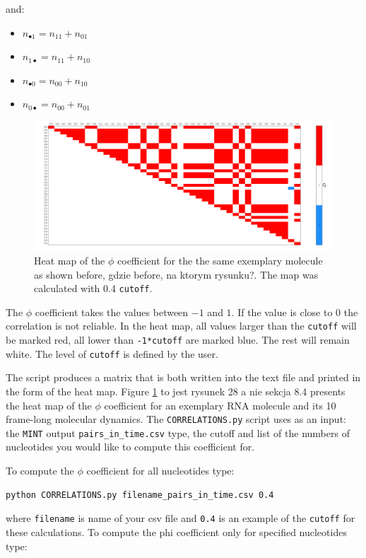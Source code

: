 \documentclass[12pt]{article}
\begin{document}
and:
\begin{itemize}
\item $n_{\bullet1} = n_{11}+n_{01}$
\item $n_{1\bullet} = n_{11}+n_{10}$
\item $n_{\bullet0} = n_{00}+n_{10}$
\item $n_{0\bullet} = n_{00}+n_{01}$
\end{itemize}

\begin{figure}[h!]
\label{coefficient}
\centering
\includegraphics[scale=0.4]{./pictures/correlation_matrix.png}
\caption{Heat map of the $\phi$ coefficient for the the same exemplary molecule as shown before, {\color{red} gdzie before, na ktorym rysunku?}. The map was calculated with 0.4 \texttt{cutoff}.}
\end{figure}

The $\phi$ coefficient takes the values between $-1$ and $1$. If the value is close to $0$ the correlation is not reliable. In the heat map, all values larger than the \texttt{cutoff} will be marked red, all lower than \texttt{-1*cutoff} are marked blue. The rest will remain white. The level of \texttt{cutoff} is defined by the user.

The script produces a matrix that is both written into the text file and printed in the form of the heat map. Figure \ref{coefficient} {\color{red}  to jest rysunek 28 a nie sekcja 8.4} presents the heat map of the $\phi$ coefficient for an exemplary RNA molecule and its 10 frame-long molecular dynamics. The \texttt{CORRELATIONS.py} script uses as an input: the \texttt{MINT} output \texttt{pairs\_in\_time.csv} type, the cutoff and list of the numbers of nucleotides you would like to compute this coefficient for.

To compute the $\phi$ coefficient for all nucleotides type:
\begin{verbatim}
python CORRELATIONS.py filename_pairs_in_time.csv 0.4
\end{verbatim}
where \texttt{filename} is name of your csv file and \texttt{0.4} is an example of the \texttt{cutoff} for these calculations.
To compute the phi coefficient only for specified nucleotides type:\\
\end{document}
